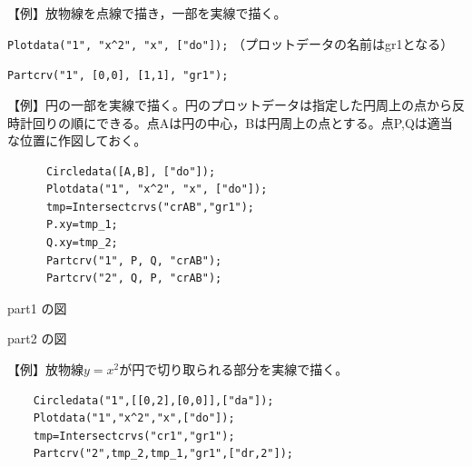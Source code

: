 \documentclass[papersize,a4paper,12pt,uplatex]{jsarticle}
\begin{document}
\begin{description}
\vspace{\baselineskip}
【例】放物線を点線で描き，一部を実線で描く。
  
    \verb|Plotdata("1", "x^2", "x", ["do"]);|  （プロットデータの名前はgr1となる）
    
    \verb|Partcrv("1", [0,0], [1,1], "gr1");|

\begin{center}  \end{center}

【例】円の一部を実線で描く。円のプロットデータは指定した円周上の点から反時計回りの順にできる。点Aは円の中心，Bは円周上の点とする。点P,Qは適当な位置に作図しておく。
\begin{verbatim}
      Circledata([A,B], ["do"]);
      Plotdata("1", "x^2", "x", ["do"]);
      tmp=Intersectcrvs("crAB","gr1");
      P.xy=tmp_1;
      Q.xy=tmp_2;
      Partcrv("1", P, Q, "crAB");
      Partcrv("2", Q, P, "crAB");
\end{verbatim}
\vspace{5mm}

\begin{minipage}{45mm}
\begin{center}
\begin{center}  \end{center}
part1 の図
\end{center}
\end{minipage}
\hspace{10mm}
\begin{minipage}{45mm}
\begin{center}
\begin{center}  \end{center}
part2 の図
\end{center}
\end{minipage}
\vspace{\baselineskip}
\vspace{\baselineskip}
【例】放物線$y=x^2$が円で切り取られる部分を実線で描く。
\begin{verbatim}
    Circledata("1",[[0,2],[0,0]],["da"]);
    Plotdata("1","x^2","x",["do"]);
    tmp=Intersectcrvs("cr1","gr1");
    Partcrv("2",tmp_2,tmp_1,"gr1",["dr,2"]);
\end{verbatim}
\vspace{\baselineskip}
                  \begin{center}  \end{center}


\end{description}
\end{document}
